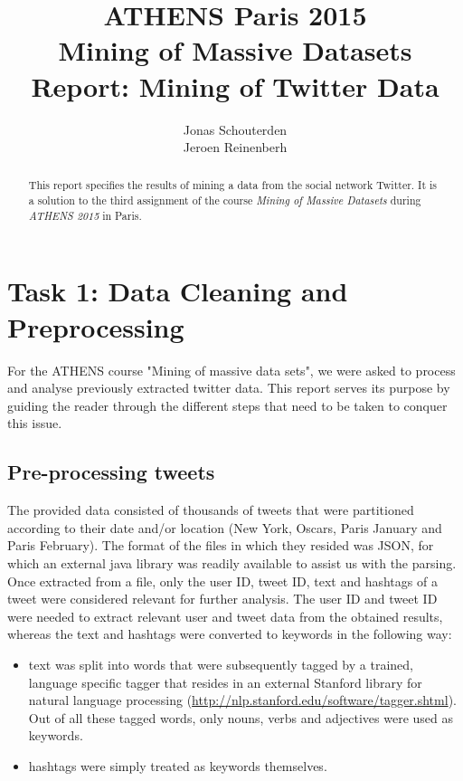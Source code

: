 \documentclass[10pt,a4paper]{article}
\author{Jonas Schouterden\\
Jeroen Reinenberh}
\title{ATHENS Paris 2015\\
Mining of Massive Datasets\\
Report: Mining of Twitter Data}
\begin{document}
\maketitle
\begin{abstract}
This report specifies the results of mining a data from the social network Twitter. It is a solution to the third assignment of the course \emph{Mining of Massive Datasets} during \emph{ATHENS 2015} in Paris.
\end{abstract}

\section{Task 1: Data Cleaning and Preprocessing}
For the ATHENS course "Mining of massive data sets", we were asked to process and analyse previously extracted twitter data. This report serves its purpose by guiding the reader through the different steps that need to be taken to conquer this issue. 
\subsection{Pre-processing tweets}
The provided data consisted of thousands of tweets that were partitioned according to their date and/or location (New York, Oscars, Paris January and Paris February). The format of the files in which they resided was JSON, for which an external java library was readily available to assist us with the parsing.\\

Once extracted from a file, only the user ID, tweet ID, text and hashtags of a tweet were considered relevant for further analysis. The user ID and tweet ID were needed to extract relevant user and tweet data from the obtained results, whereas the text and hashtags were converted to keywords in the following way:
\begin{itemize}
\item text was split into words that were subsequently tagged by a trained, language specific tagger that resides in an external Stanford library for natural language processing (\url{http://nlp.stanford.edu/software/tagger.shtml}). Out of all these tagged words, only nouns, verbs and adjectives were used as keywords.
\item hashtags were simply treated as keywords themselves.
\end{itemize}
\end{document}
